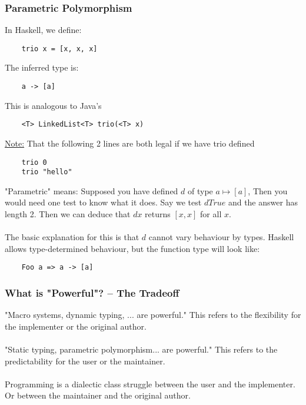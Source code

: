 \documentclass[12pt]{article}
\begin{document}
\subsubsection{Parametric Polymorphism}

In Haskell, we define:

\begin{lstlisting}
    trio x = [x, x, x]
\end{lstlisting}
The inferred type is:
\begin{lstlisting}
    a -> [a]
\end{lstlisting}
This is analogous to Java's 
\begin{lstlisting}
    <T> LinkedList<T> trio(<T> x)
\end{lstlisting}

\underline{Note:} That the following 2 lines are both legal if we have trio defined
\begin{lstlisting}
    trio 0
    trio "hello"
\end{lstlisting}

"Parametric" means:
Supposed you have defined $d$ of type $a \mapsto [a]$, Then you would need one test to know what it does. Say we test $d True$ and the answer has length 2. Then we can deduce that $d x$ returns $[x,x]$ for all $x$.\\
\\
The basic explanation for this is that $d$ cannot vary behaviour by types. Haskell allows type-determined behaviour, but the function type will look like:
\begin{lstlisting}
    Foo a => a -> [a]
\end{lstlisting}

\subsubsection{What is "Powerful"? -- The Tradeoff}

"Macro systems, dynamic typing, ... are powerful." This refers to the flexibility for the implementer or the original author.\\
\\
"Static typing, parametric polymorphism... are powerful." This refers to the predictability for the user or the maintainer.\\
\\
Programming is a dialectic class struggle between the user and the implementer. Or between the maintainer and the original author.
\end{document}
